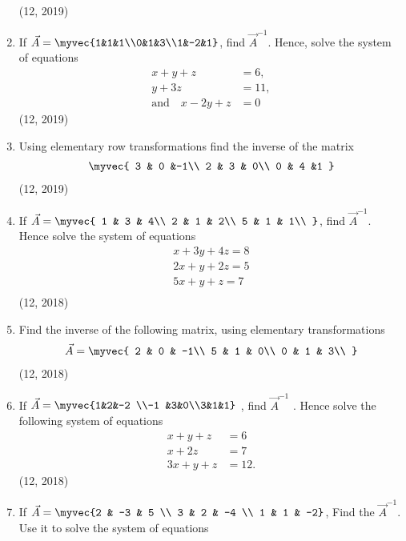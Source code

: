 \begin{enumerate}[label=\thesubsection.\arabic*,ref=\thesubsection.\theenumi]
\begin{align*}
\end{align*}
\hfill (12, 2019)
\item If $\vec{A} = \myvec{1&1&1\\0&1&3\\1&-2&1}$, find $\vec{A}^{-1}$.
Hence, solve the system of equations 
\begin{align*}
    x+y+z&=6 ,\\
    y+3z&=11 ,\\
    \text  {and} \hspace{12pt}x-2y+z&= 0
\end{align*}
\hfill (12, 2019)
\item Using elementary row transformations find the inverse of the matrix
\begin{align*}
	\myvec{
			3 & 0 &-1\\
			2 & 3 & 0\\
			0 & 4 &1
		}
\end{align*}
\hfill (12, 2019)
\item If $\vec{A}=\myvec{
    1 & 3 & 4\\
    2 & 1 & 2\\
    5 & 1 & 1\\
}$,
find  ${\vec{A}}^{-1}$. Hence solve the system of equations 
\begin{align*}
      {x + 3y + 4z = 8} \\
      {2x + y + 2z = 5}\\
    {5x + y + z = 7}\\
\end{align*}
\hfill (12, 2018)
\item Find the inverse of the following matrix, using elementary transformations
\begin{align*}
\vec{A}= \myvec{
    2 & 0 & -1\\
    5 & 1 & 0\\
    0 & 1 & 3\\
}
\end{align*}
\hfill (12, 2018)
  \item If $\vec{A}=\myvec {1&2&-2 \\-1 &3&0\\3&1&1}$ , find $\vec{A}^{-1}$ . Hence solve the following system of equations 
\begin{align*}
	x+y+z&= 6
	  \\
	  x+2z&=7
	  \\
	  3x+y+z&=12. 
\end{align*}
\hfill (12, 2018)
\item If $\vec{A}=\myvec{2 & -3 & 5 \\ 3 & 2 & -4 \\ 1 & 1 & -2}$, Find the $\vec{A}^{-1}$. Use it to solve the system of equations 

\end{enumerate}
